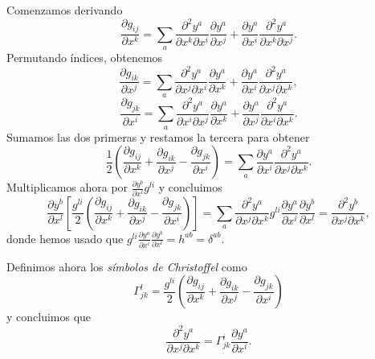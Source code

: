 \documentclass[11pt,a4paper]{amsbook}
\theoremstyle{remark} \newtheorem{rmk}[subsection]{Observación}
\theoremstyle{definition} \newtheorem{defn}[subsection]{Definición}
\theoremstyle{definition} \newtheorem{ex}[subsection]{Ejemplo}
\theoremstyle{definition} \newtheorem{ej}[subsection]{Ejercicio}
\begin{document}
Comenzamos derivando
\begin{equation*}
\frac{\partial g_{ij}}{\partial x^k} = \sum_a \frac{\partial^2 y^a}{\partial x^k \partial x^i} \frac{\partial y^a}{\partial x^j} +  \frac{\partial y^a}{\partial x^i}\frac{\partial^2 y^a}{\partial x^k \partial x^j}.
\end{equation*}
Permutando índices, obtenemos
\begin{equation*}
\frac{\partial g_{ik}}{\partial x^j} = \sum_a \frac{\partial^2 y^a}{\partial x^j \partial x^i} \frac{\partial y^a}{\partial x^k} +  \frac{\partial y^a}{\partial x^i}\frac{\partial^2 y^a}{\partial x^j \partial x^k},
\end{equation*}
\begin{equation*}
\frac{\partial g_{jk}}{\partial x^i} = \sum_a \frac{\partial^2 y^a}{\partial x^i \partial x^j} \frac{\partial y^a}{\partial x^k} +  \frac{\partial y^a}{\partial x^j}\frac{\partial^2 y^a}{\partial x^i \partial x^k}.
\end{equation*}
Sumamos las dos primeras y restamos la tercera para obtener
\begin{equation*}
\frac{1}{2} \left( \frac{\partial g_{ij}}{\partial x^k} + \frac{\partial g_{ik}}{\partial x^j} - \frac{\partial g_{jk}}{\partial x^i} \right) = \sum_a \frac{\partial y^a}{\partial x^i}\frac{\partial^2 y^a}{\partial x^j \partial x^k}.
\end{equation*}
Multiplicamos ahora por $\frac{\partial y^b}{\partial x^l} g^{li}$ y concluimos
\begin{equation*}
\frac{\partial y^b}{\partial x^l} \left[ \frac{g^{li}}{2} \left( \frac{\partial g_{ij}}{\partial x^k} + \frac{\partial g_{ik}}{\partial x^j} - \frac{\partial g_{jk}}{\partial x^i} \right)  \right] = \sum_a \frac{\partial^2 y^a}{\partial x^j \partial x^k}g^{li}\frac{\partial y^a}{\partial x^i}\frac{\partial y^b}{\partial x^l} =\frac{\partial^2 y^b}{\partial x^j \partial x^k} ,
\end{equation*}
donde hemos usado que $g^{li} \frac{\partial y^a}{\partial x^i}\frac{\partial y^b}{\partial x^l} = h^{ab} = \delta^{ab}$.

Definimos ahora los \emph{símbolos de Christoffel} como
\begin{equation*}
\Gamma^{l}_{jk} = \frac{g^{li}}{2} \left( \frac{\partial g_{ij}}{\partial x^k} + \frac{\partial g_{ik}}{\partial x^j} - \frac{\partial g_{jk}}{\partial x^i} \right)
\end{equation*}
y concluimos que
\begin{equation*}
\frac{\partial^2 y^a}{\partial x^j \partial x^k} = \Gamma^i_{jk}\frac{\partial y^a}{\partial x^i}.
\end{equation*}
\end{document}
